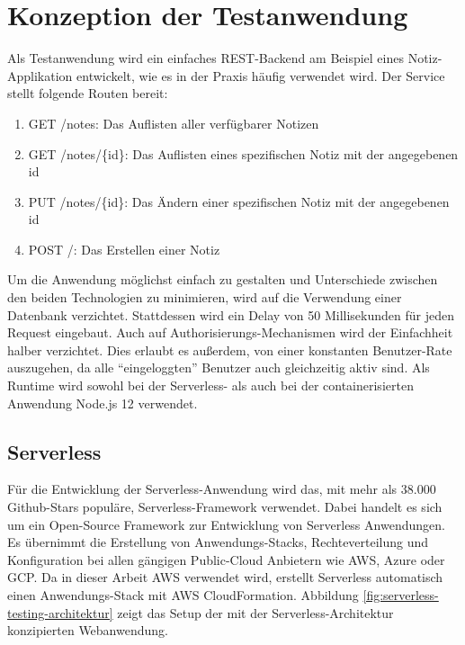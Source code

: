 \section{Konzeption der Testanwendung}
Als Testanwendung wird ein einfaches REST-Backend am Beispiel eines Notiz-Applikation entwickelt, wie es in der Praxis häufig verwendet wird. Der Service stellt folgende Routen bereit:  

\begin{enumerate}
    \item GET /notes: Das Auflisten aller verfügbarer Notizen
    \item GET /notes/\{id\}: Das Auflisten eines spezifischen Notiz mit der angegebenen id
    \item PUT /notes/\{id\}: Das Ändern einer spezifischen Notiz mit der angegebenen id
    \item POST /: Das Erstellen einer Notiz
\end{enumerate}

Um die Anwendung möglichst einfach zu gestalten und Unterschiede zwischen den beiden Technologien zu minimieren, wird auf die Verwendung einer Datenbank verzichtet. Stattdessen wird ein Delay von 50 Millisekunden für jeden Request eingebaut. 
Auch auf Authorisierungs-Mechanismen wird der Einfachheit halber verzichtet. Dies erlaubt es außerdem, von einer konstanten Benutzer-Rate auszugehen, da alle "`eingeloggten"' Benutzer auch gleichzeitig aktiv sind\cite{molyneaux_art_2014}. 
Als Runtime wird sowohl bei der Serverless- als auch bei der containerisierten Anwendung Node.js 12 verwendet.

\subsection{Serverless}
Für die Entwicklung der Serverless-Anwendung wird das, mit mehr als 38.000 Github-Stars populäre, Serverless-Framework verwendet\cite{noauthor_serverlessserverless_nodate}. Dabei handelt es sich um ein Open-Source Framework zur Entwicklung von Serverless Anwendungen. Es übernimmt die Erstellung von Anwendungs-Stacks, Rechteverteilung und Konfiguration bei allen gängigen Public-Cloud Anbietern wie AWS, Azure oder GCP. Da in dieser Arbeit AWS verwendet wird, erstellt Serverless automatisch einen Anwendungs-Stack mit AWS CloudFormation. 
Abbildung \ref{fig:serverless-testing-architektur} zeigt das Setup der mit der Serverless-Architektur konzipierten Webanwendung.

